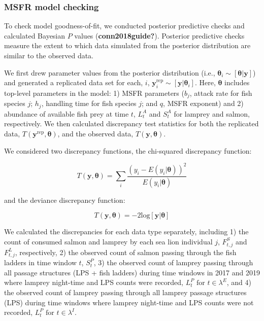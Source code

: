 \documentclass[
]{article}
\begin{document}
\subsubsection{MSFR model checking}\label{msfr-model-checking}

To check model goodness-of-fit, we conducted posterior predictive checks
and calculated Bayesian \(P\) values (\textbf{conn2018guide?}).
Posterior predictive checks measure the extent to which data simulated
from the posterior distribution are similar to the observed data.

We first drew parameter values from the posterior distribution (i.e.,
\(\boldsymbol{\theta}_i \sim [\boldsymbol{\theta}|\textbf{y}]\)) and
generated a replicated data set for each, \(i\),
\(\textbf{y}_i^{\text{rep}} \sim [\textbf{y}|\boldsymbol{\theta}_i]\).
Here, \(\boldsymbol{\theta}\) includes top-level parameters in the
model: 1) MSFR parameters (\(b_j\), attack rate for fish species \(j\);
\(h_j\), handling time for fish species \(j\); and \(q\), MSFR exponent)
and 2) abundance of available fish prey at time \(t\), \(L_t^A\) and
\(S_t^A\) for lamprey and salmon, respectively. We then calculated
discrepancy test statistics for both the replicated data,
\(T(\textbf{y}^{\text{rep}}, \boldsymbol{\theta})\), and the observed
data, \(T(\textbf{y}, \boldsymbol{\theta})\).

We considered two discrepancy functions, the chi-squared discrepancy
function:

\[
T(\textbf{y}, \boldsymbol{\theta}) = \sum_i \frac{(y_i - E(y_i|\boldsymbol{\theta}))^2}{E(y_i|\boldsymbol{\theta})}
\]

and the deviance discrepancy function:

\[
T(\textbf{y}, \boldsymbol{\theta}) = -2\text{log}[\textbf{y}|\boldsymbol{\theta}]
\]

We calculated the discrepancies for each data type separately, including
1) the count of consumed salmon and lamprey by each sea lion individual
\(j\), \(F_{t,j}^S\) and \(F_{t,j}^L\), respectively, 2) the observed
count of salmon passing through the fish ladders in time window \(t\),
\(S_t^P\), 3) the observed count of lamprey passing through all passage
structures (LPS + fish ladders) during time windows in 2017 and 2019
where lamprey night-time and LPS counts were recorded,
\(L_t^P \text{ for } t \in \lambda^E\), and 4) the observed count of
lamprey passing through all lamprey passage structures (LPS) during time
windows where lamprey night-time and LPS counts were not recorded,
\(L_t^P \text{ for } t \in \lambda^I\).
\end{document}

